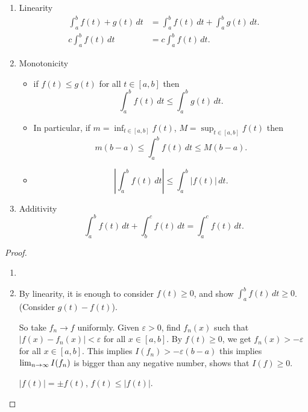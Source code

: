 \documentclass[10pt, a4paper]{article}
\begin{document}
\begin{theorem}\phantom{}
    \begin{enumerate}[label = (\roman*)]
        \item Linearity
        \begin{align*}
            \int_{a}^{b}f(t) + g(t)\,dt &= \int_{a}^{b}f(t)\,dt + \int_{a}^{b}g(t)\,dt. \\
            c\int_{a}^{b}f(t)\,dt &= c\int_{a}^{b}f(t)\,dt.
        \end{align*}

        \item Monotonicity

        \begin{itemize}
            \item 
            if $f(t) \leq g(t)$ for all $t \in [a, b]$ then
            \[
            \int_{a}^{b}f(t)\,dt \leq \int_{a}^{b}g(t)\,dt.
            \]

            \item
            In particular,
            if $m = \inf_{t \in [a, b]}{f(t)}$,
            $M = \sup_{t \in [a, b]}{f(t)}$ then
            \[
            m(b - a) \leq \int_{a}^{b}f(t)\,dt \leq M(b - a).
            \]

            \item
            \[
            \left|\int_{a}^{b}f(t)\,dt\right| \leq \int_{a}^{b}|f(t)|\,dt.
            \]
        \end{itemize}
        \item Additivity
        \[
        \int_{a}^{b}f(t)\,dt + \int_{b}^{c}f(t)\,dt = \int_{a}^{c}f(t)\,dt.
        \]
    \end{enumerate}

    \begin{proof}
        \begin{enumerate}[label = (\roman*)]
            \item \phantom{}
            
            \item
            By linearity,
            it is enough to consider $f(t) \geq 0$,
            and show $\int_{a}^{b}f(t)\,dt \geq 0$.
            (Consider $g(t) - f(t)$).

            So take $f_n \to f$ uniformly.
            Given $\varepsilon > 0$,
            find $f_n(x)$ such that $|f(x) - f_n(x)| < \varepsilon$ for all $x \in [a, b]$.
            By $f(t) \geq 0$,
            we get $f_n(x) > -\varepsilon$ for all $x \in [a, b]$.
            This implies $I(f_n) > -\varepsilon(b - a)$ this implies $\lim_{n \rightarrow \infty} I(f_n)$ is bigger than any negative number,
            shows that $I(f) \geq 0$.

            $|f(t)| = \pm f(t)$,
            $f(t) \leq |f(t)|$.
        \end{enumerate}
    \end{proof}
\end{theorem}
\end{document}
